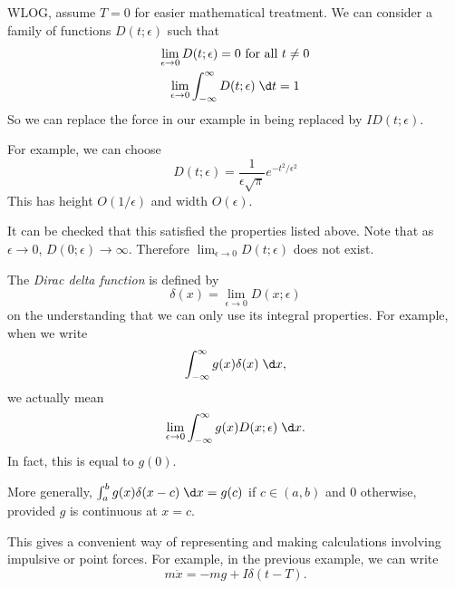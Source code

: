 \documentclass[a4paper]{article}
\begin{document}
  WLOG, assume $T = 0$ for easier mathematical treatment. We can consider a family of functions $D(t; \epsilon)$ such that 
  \begin{gather*}
    \lim_{\epsilon\to 0} D(t; \epsilon) = 0 \text{ for all }t \not= 0\\
    \lim_{\epsilon\to 0}\int_{-\infty}^\infty D(t; \epsilon) \;\d t = 1
  \end{gather*}
  So we can replace the force in our example in being replaced by $ID(t; \epsilon)$.

  For example, we can choose 
  \[
    D(t; \epsilon) = \frac{1}{\epsilon\sqrt{\pi}}e^{-t^2/\epsilon^2}
  \]
  This has height $O(1/\epsilon)$ and width $O(\epsilon)$.

  It can be checked that this satisfied the properties listed above. Note that as $\epsilon \to 0$, $D(0; \epsilon)\to \infty$. Therefore $\displaystyle \lim_{\epsilon\to 0} D(t; \epsilon)$ does not exist.

  \begin{defi}
    The \emph{Dirac delta function} is defined by 
    \[
      \delta(x) = \lim_{\epsilon \to 0} D(x; \epsilon)
    \]
    on the understanding that we can only use its integral properties. For example, when we write
    \[
      \int_{-\infty}^{\infty} g(x)\delta (x) \;\d x,
    \]
    we actually mean
    \[
      \lim_{\epsilon \to 0} \int_{-\infty}^{\infty} g(x)D(x; \epsilon)\;\d x.
    \]
    In fact, this is equal to $g(0)$. 

    More generally, $\int_a^b g(x)\delta(x - c)\;\d x = g(c)$ if $c\in (a, b)$ and $0$ otherwise, provided $g$ is continuous at $x = c$.
  \end{defi}

  This gives a convenient way of representing and making calculations involving impulsive or point forces. For example, in the previous example, we can write
  \[
    m\ddot x = -mg + I\delta(t - T).
  \]
\end{document}
